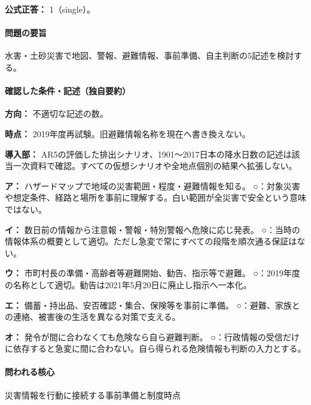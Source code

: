 \textbf{公式正答：} 1（single）。

\paragraph{問題の要旨} 水害・土砂災害で地図、警報、避難情報、事前準備、自主判断の5記述を検討する。

\paragraph{確認した条件・記述（独自要約）}\mbox{}\par

\noindent\textbf{方向：} 不適切な記述の数。\par

\noindent\textbf{時点：} 2019年度再試験。旧避難情報名称を現在へ書き換えない。\par

\noindent\textbf{導入部：} AR5の評価した排出シナリオ、1901〜2017日本の降水日数の記述は該当一次資料で確認。すべての仮想シナリオや全地点個別の結果へ拡張しない。\par

\noindent\textbf{ア：} ハザードマップで地域の災害範囲・程度・避難情報を知る。 ○：対象災害や想定条件、経路と場所を事前に理解する。白い範囲が全災害で安全という意味ではない。\par

\noindent\textbf{イ：} 数日前の情報から注意報・警報・特別警報へ危険に応じ発表。 ○：当時の情報体系の概要として適切。ただし急変で常にすべての段階を順次通る保証はない。\par

\noindent\textbf{ウ：} 市町村長の準備・高齢者等避難開始、勧告、指示等で避難。 ○：2019年度の名称として適切。勧告は2021年5月20日に廃止し指示へ一本化。\par

\noindent\textbf{エ：} 備蓄・持出品、安否確認・集合、保険等を事前に準備。 ○：避難、家族との連絡、被害後の生活を異なる対策で支える。\par

\noindent\textbf{オ：} 発令が間に合わなくても危険なら自ら避難判断。 ○：行政情報の受信だけに依存すると急変に間に合わない。自ら得られる危険情報も判断の入力とする。\par

\paragraph{問われる核心} 災害情報を行動に接続する事前準備と制度時点

